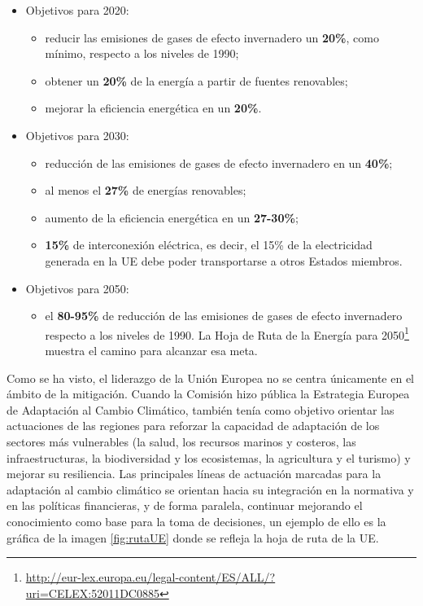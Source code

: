 \begin{itemize}
\item
  Objetivos para 2020:

  \begin{itemize}
  \item
    reducir las emisiones de gases de efecto invernadero un
    \textbf{20\%}, como mínimo, respecto a los niveles de 1990;
  \item
    obtener un \textbf{20\%} de la energía a partir de fuentes
    renovables;
  \item
    mejorar la eficiencia energética en un \textbf{20\%}.
  \end{itemize}
\item
  Objetivos para 2030:

  \begin{itemize}
  \item
    reducción de las emisiones de gases de efecto invernadero en un
    \textbf{40\%};
  \item
    al menos el \textbf{27\%} de energías renovables;
  \item
    aumento de la eficiencia energética en un \textbf{27-30\%};
  \item
    \textbf{15\%} de interconexión eléctrica, es decir, el 15\% de la
    electricidad generada en la UE debe poder transportarse a otros
    Estados miembros.
  \end{itemize}
\item
  Objetivos para 2050:

  \begin{itemize}
  \item
    el \textbf{80-95\%} de reducción de las emisiones de gases de efecto
    invernadero respecto a los niveles de 1990. La Hoja
    de Ruta de la Energía para 2050\footnote{\url{http://eur-lex.europa.eu/legal-content/ES/ALL/?uri=CELEX:52011DC0885}}
     muestra el camino para alcanzar esa
    meta.
  \end{itemize}
\end{itemize}

Como se ha visto, el liderazgo de la Unión Europea no se centra
únicamente en el ámbito de la mitigación. Cuando la Comisión hizo
pública la Estrategia Europea de Adaptación al Cambio Climático, también
tenía como objetivo orientar las actuaciones de las regiones para
reforzar la capacidad de adaptación de los sectores más vulnerables (la
salud, los recursos marinos y costeros, las infraestructuras, la
biodiversidad y los ecosistemas, la agricultura y el turismo) y mejorar
su resiliencia. Las principales líneas de actuación marcadas para la
adaptación al cambio climático se orientan hacia su integración en la
normativa y en las políticas financieras, y de forma paralela, continuar
mejorando el conocimiento como base para la toma de decisiones, un ejemplo de ello es la gráfica de la imagen \autoref{fig:rutaUE} donde se refleja la hoja de ruta de la UE.

